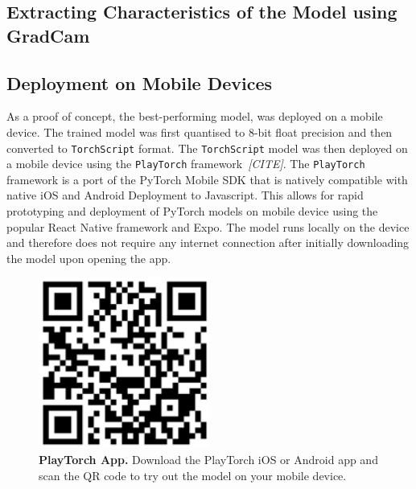 \documentclass[a4paper]{article}
\begin{document}

  \subsection{Extracting Characteristics of the Model using GradCam} %
  \label{sub:Mispredicted Samples}



  \subsection{Deployment on Mobile Devices}
  \label{sub:deploment}

  As a proof of concept, the best-performing model, was deployed on a mobile
  device. The trained model was first quantised to 8-bit float precision and
  then converted to \texttt{TorchScript} format. The \texttt{TorchScript} model
  was then deployed on a mobile device using the \texttt{PlayTorch}
  framework~\textit{[CITE]}. The \texttt{PlayTorch} framework is a port of the
  PyTorch Mobile SDK that is natively compatible with native iOS and Android
  Deployment to Javascript. This allows for rapid prototyping and deployment of
  PyTorch models on mobile device using the popular React Native framework and
  Expo. The model runs locally on the device and therefore does not require any
  internet connection after initially downloading the model upon opening the
  app.

  \begin{figure}[ht]
    \centering
    \includegraphics[width=0.5\textwidth]{./figures/playtorch-qr.png}
    \caption{
      \textbf{PlayTorch App.} Download the PlayTorch iOS or Android app and scan
    the QR code to try out the model on your mobile device.}
    \label{fig:playtorch-qr}
  \end{figure}
\end{document}
